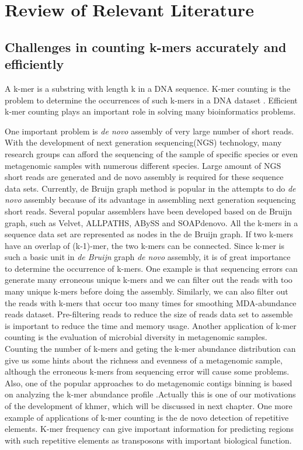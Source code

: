 \chapter{Review of Relevant Literature}


\section{Challenges in counting k-mers accurately and efficiently}

A k-mer is a substring with length k in a DNA sequence. K-mer counting is the
problem to determine the occurrences of such k-mers in a DNA dataset 
\cite{Marcais2011}. Efficient k-mer counting plays an important role in solving many
bioinformatics problems. 

One important problem is \textit{de novo} assembly of very large number of short reads.
With the development of next generation sequencing(NGS) technology, many research
groups can afford the sequencing of the sample of specific species or even
metagenomic samples with numerous different species\cite{pubmed19997069}. 
Large amount of NGS short reads are generated and de novo assembly is
required for these sequence data sets\cite{pubmed20211242}. Currently, de Bruijn graph method is
popular in the attempts to do \textit{de novo} assembly because of its advantage in
assembling next generation sequencing short reads\cite{Pevzner2001}. Several
popular assemblers have been developed based on de Bruijn graph, such as
Velvet\cite{Zerbino2008}, ALLPATHS\cite{Butler2008}, ABySS\cite{Simpson2009}
and SOAPdenovo\cite{Li2010}. All the k-mers in a sequence
data set are represented as nodes in the de Bruijn graph. If
two k-mers have an overlap of (k-1)-mer, the two k-mers can be connected. Since
k-mer is such a basic unit in \textit{de Bruijn} graph \textit{de novo}
assembly, it is of
great importance to determine the occurrence of k-mers. One example is that
sequencing errors can generate many erroneous unique k-mers and we can filter
out the reads with too many unique k-mers before doing the assembly. Similarly,
we can also filter out the reads with k-mers that occur too many times for
smoothing MDA-abundance reads dataset. Pre-filtering reads to reduce the size
of reads data set to assemble is important to reduce the time and memory usage.
Another application of k-mer counting is the evaluation of microbial diversity
in metagenomic samples. Counting the number of k-mers and geting the k-mer
abundance distribution can give us some hints about the richness and evenness
of a metagenomic sample, although the erroneous k-mers from sequencing error
will cause some problems. Also, one of the popular approaches to do metagenomic
contigs binning is based on analyzing the k-mer abundance profile 
\cite{Patil:2012aa} \cite{Brady:2011aa}\cite{Rosen:2011aa}.Actually this is 
one of our motivations of the development of khmer, which
will be discussed in next chapter. One more example of applications of 
k-mer counting is the de novo detection of repetitive
elements. K-mer frequency can give important information for predicting regions
with  such repetitive elements as transposons with important biological
function.\cite{Kurtz2008}

